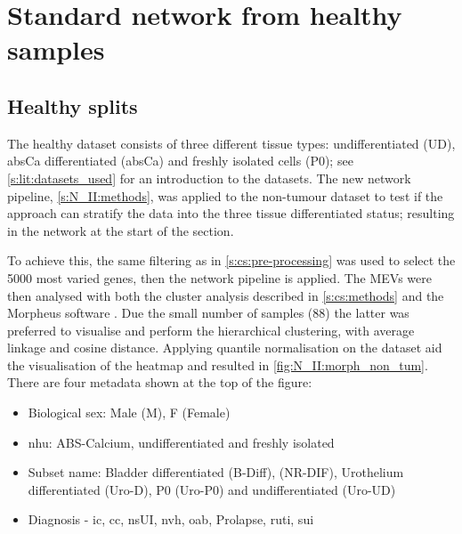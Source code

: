 \section{Standard network from healthy samples}  \label{s:N_II:std_net}

\vspace{3mm}
\vspace{3mm}

\subsection{Healthy splits} \label{s:N_II:std}

The healthy dataset consists of three different tissue types: undifferentiated (UD), \acrshort{absCa} differentiated (\acrshort{absCa}) and freshly isolated cells (P0); see \cref{s:lit:datasets_used} for an introduction to the datasets. The new network pipeline, \cref{s:N_II:methods}, was applied to the non-tumour dataset to test if the approach can stratify the data into the three tissue differentiated status; resulting in the network at the start of the section.

To achieve this, the same filtering as in \cref{s:cs:pre-processing} was used to select the 5000 most varied genes, then the network pipeline is applied. The MEVs were then analysed with both the cluster analysis described in \cref{s:cs:methods} and the Morpheus software \citep{Broad-Institute2016-tn}. Due the small number of samples (88) the latter was preferred to visualise and perform the hierarchical clustering, with average linkage and cosine distance. Applying quantile normalisation on the dataset aid the visualisation of the heatmap and resulted in \cref{fig:N_II:morph_non_tum}. There are four metadata shown at the top of the figure: 
\begin{itemize}
    \item Biological sex: Male (M), F (Female)
    \item \acrfull{nhu}: ABS-Calcium, undifferentiated and freshly isolated
    \item Subset name: Bladder differentiated (B-Diff), (NR-DIF), Urothelium differentiated (Uro-D), P0 (Uro-P0) and undifferentiated (Uro-UD)
    \item Diagnosis - \acrfull{ic}, \acrfull{cc}, \acrfull{nsUI},  \acrfull{nvh}, \acrfull{oab}, Prolapse, \acrfull{ruti}, \acrfull{sui}
\end{itemize} 

